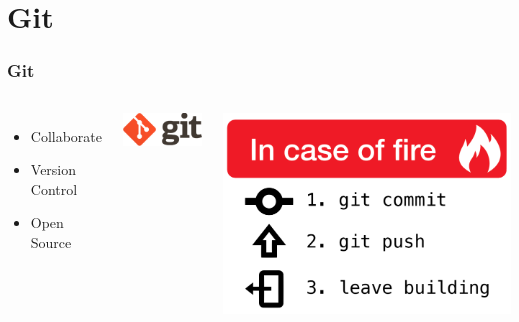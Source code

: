     
    \section{Git}
	\begin{frame}
		\frametitle{Git}
		\begin{columns}[c]
        		\begin{itemize}
					\item Collaborate
                    \item Version Control
                    \item Open Source
          		\end{itemize}
            	\centering
				\includegraphics[width=.7\linewidth,]{res/git}

				\vspace{1cm} %

				\includegraphics[width=.7\linewidth]{res/fire}
        \end{columns}
	\end{frame}
    
